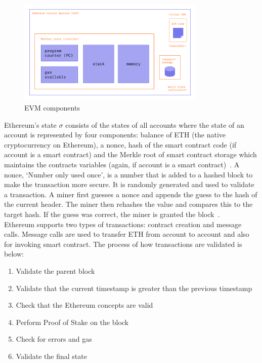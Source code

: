 \begin{figure}[!htb]
    \centering
    \includegraphics[width=0.8\textwidth]{background/Images/evm.png}
    \caption{EVM components~\cite{noauthor_ethereum_nodate}}
\end{figure}

\noindent Ethereum's state $\sigma$ consists of the states of all accounts where the state of an account is represented by four components: balance of ETH (the native cryptocurrency on Ethereum), a nonce, hash of the smart contract code (if account is a smart contract) and the Merkle root of smart contract storage which maintains the contracts variables (again, if account is a smart contract)~\cite{ethereum_yellowpaper}. A nonce, `Number only used once', is a number that is added to a hashed block to make the transaction more secure. It is randomly generated and used to validate a transaction. A miner first guesses a nonce and appends the guess to the hash of the current header. The miner then rehashes the value and compares this to the target hash. If the guess was correct, the miner is granted the block~\cite{noauthor_components_2021}.
\\[5mm]
Ethereum supports two types of transactions: contract creation and message calls. Message calls are used to transfer ETH from account to account and also for invoking smart contract. The process of how transactions are validated is below:
\begin{enumerate}
    \itemsep0em
    \item Validate the parent block
    \item Validate that the current timestamp is greater than the previous timestamp
    \item Check that the Ethereum concepts are valid
    \item Perform Proof of Stake on the block
    \item Check for errors and gas
    \item Validate the final state
\end{enumerate}

